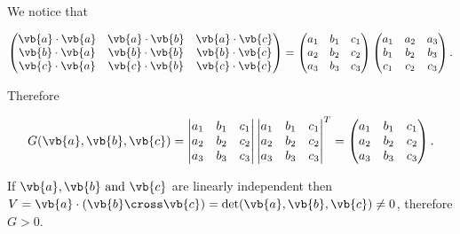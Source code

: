 \documentclass[a4paper,12pt]{report}
\begin{document}
{We notice that

\begin{equation}
    \begin{pmatrix}
        \vb{a} \cdot \vb{a}  & \vb{a} \cdot \vb{b}  & \vb{a} \cdot \vb{c}   \\
        \vb{b} \cdot \vb{a}  & \vb{b} \cdot \vb{b}  & \vb{b} \cdot \vb{c}   \\
        \vb{c} \cdot \vb{a}  & \vb{c} \cdot \vb{b}  & \vb{c} \cdot \vb{c}   \\
    \end{pmatrix} = \begin{pmatrix}
        a_1  & b_1  & c_1   \\
        a_2  & b_2  & c_2   \\
        a_3  & b_3  & c_3   \\
    \end{pmatrix} \begin{pmatrix}
        a_1  & a_2 & a_3  \\
        b_1  & b_2  & b_3  \\
        c_1  & c_2  & c_3   \\
    \end{pmatrix}.
\end{equation}

Therefore

\begin{equation}
    G(\vb{a} ,\vb{b} ,\vb{c} ) = \begin{vmatrix}
        a_1  & b_1  & c_1   \\
        a_2  & b_2  & c_2   \\
        a_3  & b_3  & c_3   \\
    \end{vmatrix} \begin{vmatrix}
        a_1  & b_1  & c_1   \\
        a_2  & b_2  & c_2   \\
        a_3  & b_3  & c_3   \\
    \end{vmatrix}^T = \begin{pmatrix}
        a_1  & b_1  & c_1   \\
        a_2  & b_2  & c_2   \\
        a_3  & b_3  & c_3   \\
    \end{pmatrix}.
\end{equation}

If \(\vb{a} ,\vb{b} \text { and } \vb{c} \) are linearly independent then \(V = \vb{a} \cdot (\vb{b} \cross \vb{c} ) = \det (\vb{a} ,\vb{b} ,\vb{c} ) \neq 0\), therefore \(G > 0\).   
} 
\end{document}

